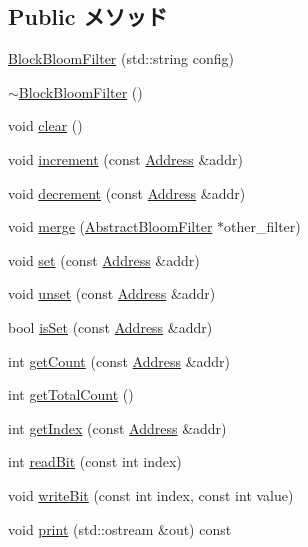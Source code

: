 \subsection*{Public メソッド}
\begin{DoxyCompactItemize}
\item 
\hyperlink{classBlockBloomFilter_a8c4fc37142485d5cb1e414e2228a730b}{BlockBloomFilter} (std::string config)
\item 
\hyperlink{classBlockBloomFilter_a94f11827de7c83b03ae2fb6da2f1fdf2}{$\sim$BlockBloomFilter} ()
\item 
void \hyperlink{classBlockBloomFilter_ac8bb3912a3ce86b15842e79d0b421204}{clear} ()
\item 
void \hyperlink{classBlockBloomFilter_a3e860ad851b771ac3b6eeb1716eb56bc}{increment} (const \hyperlink{classAddress}{Address} \&addr)
\item 
void \hyperlink{classBlockBloomFilter_addb6b805abb8328082a24926f2bf8c84}{decrement} (const \hyperlink{classAddress}{Address} \&addr)
\item 
void \hyperlink{classBlockBloomFilter_a4091f5f95de040d4e0ae5bd86817b13c}{merge} (\hyperlink{classAbstractBloomFilter}{AbstractBloomFilter} $\ast$other\_\-filter)
\item 
void \hyperlink{classBlockBloomFilter_a2b666fae2a5c2b98bc5cba8e1333bcc9}{set} (const \hyperlink{classAddress}{Address} \&addr)
\item 
void \hyperlink{classBlockBloomFilter_a69b772787ea61467af679e3aa5406b41}{unset} (const \hyperlink{classAddress}{Address} \&addr)
\item 
bool \hyperlink{classBlockBloomFilter_a4200ee289c3d941a4b209c4788f8087c}{isSet} (const \hyperlink{classAddress}{Address} \&addr)
\item 
int \hyperlink{classBlockBloomFilter_abb722634d5846105b673e9496df8d062}{getCount} (const \hyperlink{classAddress}{Address} \&addr)
\item 
int \hyperlink{classBlockBloomFilter_a97f66183ea41a7c123bab9dd5313a74a}{getTotalCount} ()
\item 
int \hyperlink{classBlockBloomFilter_a19f42f6f2fc3501021b768f0df8108b2}{getIndex} (const \hyperlink{classAddress}{Address} \&addr)
\item 
int \hyperlink{classBlockBloomFilter_a6f8a98d0f38a8d122d4cbf87323484eb}{readBit} (const int index)
\item 
void \hyperlink{classBlockBloomFilter_ac188318778d26b44f567c5b530598c16}{writeBit} (const int index, const int value)
\item 
void \hyperlink{classBlockBloomFilter_ac55fe386a101fbae38c716067c9966a0}{print} (std::ostream \&out) const 
\end{DoxyCompactItemize}
